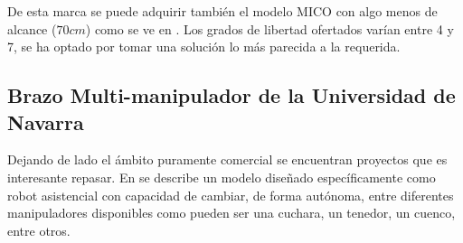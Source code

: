 	  De esta marca se puede adquirir también el modelo MICO con algo menos de alcance ($70cm$) como se ve en \cite{Mico:2018}. Los grados de libertad ofertados varían entre 4 y 7, se ha optado por tomar una solución lo más parecida a la requerida.

 \subsection{Brazo Multi-manipulador de la Universidad de Navarra}

    Dejando de lado el ámbito puramente comercial se encuentran proyectos que es interesante repasar. En \cite{Marquez:2013} se describe un modelo diseñado específicamente como robot asistencial con capacidad de cambiar, de forma autónoma, entre diferentes manipuladores disponibles como pueden ser una cuchara, un tenedor, un cuenco, entre otros.
    \\

